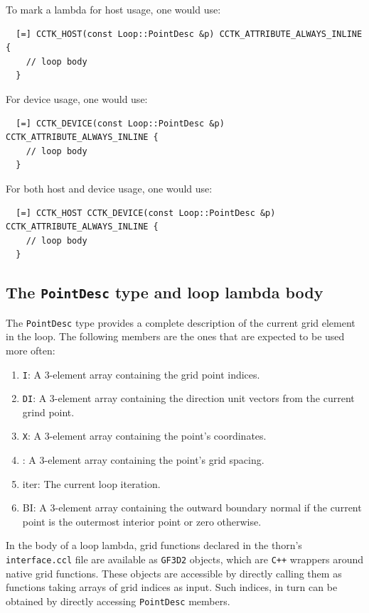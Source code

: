 To mark a lambda for host usage, one would use:
%
\begin{verbatim}
  [=] CCTK_HOST(const Loop::PointDesc &p) CCTK_ATTRIBUTE_ALWAYS_INLINE {
    // loop body
  }
\end{verbatim}
%
For device usage, one would use:
%
\begin{verbatim}
  [=] CCTK_DEVICE(const Loop::PointDesc &p) CCTK_ATTRIBUTE_ALWAYS_INLINE {
    // loop body
  }
\end{verbatim}
%
For both host and device usage, one would use:
%
\begin{verbatim}
  [=] CCTK_HOST CCTK_DEVICE(const Loop::PointDesc &p) CCTK_ATTRIBUTE_ALWAYS_INLINE {
    // loop body
  }
\end{verbatim}

\subsection{The \texttt{PointDesc} type and loop lambda body}
\label{sec:point_des}

The \texttt{PointDesc} type provides a complete description of the current grid element in the loop. The following members are the ones that are expected to be used more often:
%
\begin{enumerate}
  \item \texttt{I}: A 3-element array containing the grid point indices.
  \item \texttt{DI}: A 3-element array containing the direction unit vectors from the current grind point.
  \item \texttt{X}: A 3-element array containing the point's coordinates.
  \item {}: A 3-element array containing the point's grid spacing.
  \item {iter}: The current loop iteration.
  \item {BI}: A 3-element array containing the outward boundary normal if the current point is the outermost interior point or zero otherwise.
\end{enumerate}

In the body of a loop lambda, grid functions declared in the thorn's \texttt{interface.ccl} file are available as \texttt{GF3D2} objects, which are \texttt{C++} wrappers around native \Cactus\space grid functions. These objects are accessible by directly calling them as functions taking arrays of grid indices as input. Such indices, in turn can be obtained by directly accessing \texttt{PointDesc} members.


